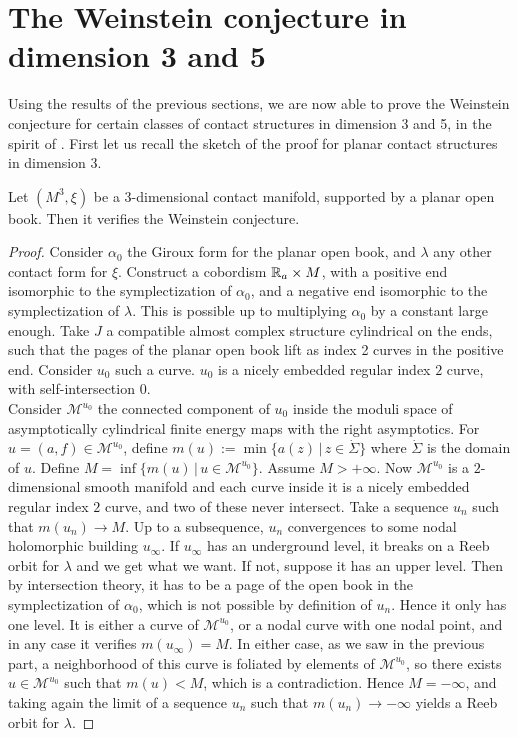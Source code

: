 \documentclass[../main.tex]{subfiles}
\begin{document}
\section{The Weinstein conjecture in dimension 3 and 5}\label{p:VI}

Using the results of the previous sections, we are now able to prove the Weinstein conjecture for certain classes of contact structures in dimension 3 and 5, in the spirit of \cite{abbas_weinstein_2005}. First let us recall the sketch of the proof for planar contact structures in dimension 3.

\begin{theorem}\cite{abbas_weinstein_2005}
Let $(M^3,\xi)$ be a 3-dimensional contact manifold, supported by a planar open book. Then it verifies the Weinstein conjecture.

\end{theorem}


\begin{proof}
Consider $\alpha_0$ the Giroux form for the planar open book, and $\lambda$ any other contact form for $\xi$. Construct a cobordism $\mathbb{R}_a\times M$, with a positive end isomorphic to the symplectization of $\alpha_0$, and a negative end isomorphic to the symplectization of $\lambda$. This is possible up to multiplying $\alpha_0$ by a constant large enough. Take $J$ a compatible almost complex structure cylindrical on the ends, such that the pages of the planar open book lift as index 2 curves in the positive end. Consider $u_0$ such a curve. $u_0$ is a nicely embedded regular index $2$ curve, with self-intersection $0$.\\
Consider $\mathcal{M}^{u_0}$ the connected component of $u_0$ inside the moduli space of asymptotically cylindrical finite energy maps with the right asymptotics. For $u = (a,f)\in\mathcal{M}^{u_0}$, define $m(u) := \min\{a(z)\,|\,z\in\dot\Sigma\}$ where $\dot\Sigma$ is the domain of $u$. Define $M = \inf \{m(u)\,|\, u\in\mathcal{M}^{u_0}\}$. Assume $M>+\infty$. Now $\mathcal{M}^{u_0}$ is a $2$-dimensional smooth manifold and each curve inside it is a nicely embedded regular index $2$ curve, and two of these never intersect. Take a sequence $u_n$ such that $m(u_n)\rightarrow M$. Up to a subsequence, $u_n$ convergences to some nodal holomorphic building $u_\infty$. If $u_\infty$ has an underground level, it breaks on a Reeb orbit for $\lambda$ and we get what we want. If not, suppose it has an upper level. Then by intersection theory, it has to be a page of the open book in the symplectization of $\alpha_0$, which is not possible by definition of $u_n$. Hence it only has one level. It is either a curve of $\mathcal{M}^{u_0}$, or a nodal curve with one nodal point, and in any case it verifies $m(u_\infty) = M$. In either case, as we saw in the previous part, a neighborhood of this curve is foliated by elements of $\mathcal{M}^{u_0}$, so there exists $u\in\mathcal{M}^{u_0}$ such that $m(u)<M$, which is a contradiction. Hence $M = -\infty$, and taking again the limit of a sequence $u_n$ such that $m(u_n)\rightarrow -\infty$ yields a Reeb orbit for $\lambda$.
\end{proof}
\end{document}
